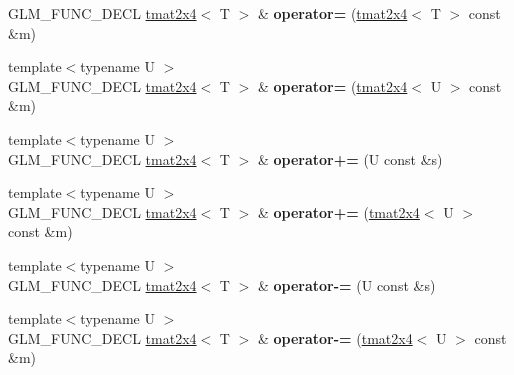 \begin{DoxyCompactItemize}
\item 
\hypertarget{structglm_1_1detail_1_1tmat2x4_a23f1bed296125c57dca1f5fe1f4b87a1}{\-G\-L\-M\-\_\-\-F\-U\-N\-C\-\_\-\-D\-E\-C\-L \hyperlink{structglm_1_1detail_1_1tmat2x4}{tmat2x4}$<$ \-T $>$ \& {\bfseries operator=} (\hyperlink{structglm_1_1detail_1_1tmat2x4}{tmat2x4}$<$ \-T $>$ const \&m)}\label{structglm_1_1detail_1_1tmat2x4_a23f1bed296125c57dca1f5fe1f4b87a1}

\item 
\hypertarget{structglm_1_1detail_1_1tmat2x4_acca5450958f200566eac33da4f7fbd70}{{\footnotesize template$<$typename U $>$ }\\\-G\-L\-M\-\_\-\-F\-U\-N\-C\-\_\-\-D\-E\-C\-L \hyperlink{structglm_1_1detail_1_1tmat2x4}{tmat2x4}$<$ \-T $>$ \& {\bfseries operator=} (\hyperlink{structglm_1_1detail_1_1tmat2x4}{tmat2x4}$<$ \-U $>$ const \&m)}\label{structglm_1_1detail_1_1tmat2x4_acca5450958f200566eac33da4f7fbd70}

\item 
\hypertarget{structglm_1_1detail_1_1tmat2x4_ac959f56ded35230fe265434c2a4a5971}{{\footnotesize template$<$typename U $>$ }\\\-G\-L\-M\-\_\-\-F\-U\-N\-C\-\_\-\-D\-E\-C\-L \hyperlink{structglm_1_1detail_1_1tmat2x4}{tmat2x4}$<$ \-T $>$ \& {\bfseries operator+=} (\-U const \&s)}\label{structglm_1_1detail_1_1tmat2x4_ac959f56ded35230fe265434c2a4a5971}

\item 
\hypertarget{structglm_1_1detail_1_1tmat2x4_af2eb2935fef1d2070286acd5b8e3ef2b}{{\footnotesize template$<$typename U $>$ }\\\-G\-L\-M\-\_\-\-F\-U\-N\-C\-\_\-\-D\-E\-C\-L \hyperlink{structglm_1_1detail_1_1tmat2x4}{tmat2x4}$<$ \-T $>$ \& {\bfseries operator+=} (\hyperlink{structglm_1_1detail_1_1tmat2x4}{tmat2x4}$<$ \-U $>$ const \&m)}\label{structglm_1_1detail_1_1tmat2x4_af2eb2935fef1d2070286acd5b8e3ef2b}

\item 
\hypertarget{structglm_1_1detail_1_1tmat2x4_ab1eb8d4aac2ee23c7fd2cec06c611192}{{\footnotesize template$<$typename U $>$ }\\\-G\-L\-M\-\_\-\-F\-U\-N\-C\-\_\-\-D\-E\-C\-L \hyperlink{structglm_1_1detail_1_1tmat2x4}{tmat2x4}$<$ \-T $>$ \& {\bfseries operator-\/=} (\-U const \&s)}\label{structglm_1_1detail_1_1tmat2x4_ab1eb8d4aac2ee23c7fd2cec06c611192}

\item 
\hypertarget{structglm_1_1detail_1_1tmat2x4_aa412ddc6f064a1e2c75468f24505fcd3}{{\footnotesize template$<$typename U $>$ }\\\-G\-L\-M\-\_\-\-F\-U\-N\-C\-\_\-\-D\-E\-C\-L \hyperlink{structglm_1_1detail_1_1tmat2x4}{tmat2x4}$<$ \-T $>$ \& {\bfseries operator-\/=} (\hyperlink{structglm_1_1detail_1_1tmat2x4}{tmat2x4}$<$ \-U $>$ const \&m)}\label{structglm_1_1detail_1_1tmat2x4_aa412ddc6f064a1e2c75468f24505fcd3}


\end{DoxyCompactItemize}
